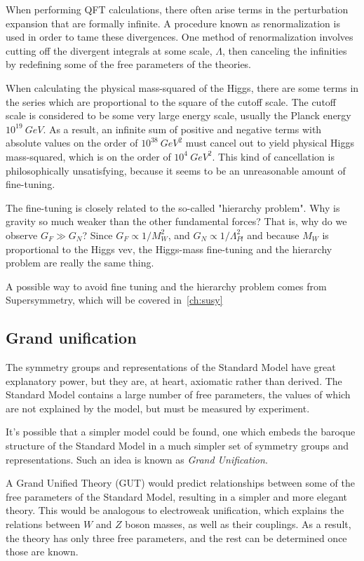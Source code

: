 When performing QFT calculations, there often arise terms in the perturbation expansion that are formally infinite.
A procedure known as renormalization is used in order to tame these divergences.
One method of renormalization involves cutting off the divergent integrals at some scale, $\Lambda$,
then canceling the infinities by redefining some of the free parameters of the theories.

When calculating the physical mass-squared of the Higgs, there are some terms in the series which are proportional to the square of the cutoff scale.
The cutoff scale is considered to be some very large energy scale, usually the Planck energy $10^{19}~GeV$.
As a result, an infinite sum of positive and negative terms with absolute values on the order of $10^{38}~GeV^2$ must cancel out
to yield physical Higgs mass-squared, which is on the order of $10^4~GeV^2$.
This kind of cancellation is philosophically unsatisfying, because it seems to be an unreasonable amount of fine-tuning.

The fine-tuning is closely related to the so-called "hierarchy problem".
Why is gravity so much weaker than the other fundamental forces?
That is, why do we observe $G_F \gg G_N$?
Since $G_F \propto 1/{M_W^2}$, and $G_N \propto 1/\Lambda_{Pl}^2$ and because $M_W$ is proportional to the Higgs vev,
the Higgs-mass fine-tuning and the hierarchy problem are really the same thing.

A possible way to avoid fine tuning and the hierarchy problem comes from Supersymmetry, which will be covered in~\ref{ch:susy}

\subsection{Grand unification}\label{subsec:sm_unification}

The symmetry groups and representations of the Standard Model have great explanatory power,
but they are, at heart, axiomatic rather than derived.
The Standard Model contains a large number of free parameters, the values of which are not explained by the model, but must be measured by experiment.

It's possible that a simpler model could be found, one which embeds the baroque structure of the Standard Model in a
much simpler set of symmetry groups and representations.
Such an idea is known as \textit{Grand Unification}.

A Grand Unified Theory (GUT) would predict relationships between some of the free parameters of the Standard Model,
resulting in a simpler and more elegant theory.
This would be analogous to electroweak unification, which explains the relations between $W$ and $Z$ boson masses,
as well as their couplings.
As a result, the theory has only three free parameters, and the rest can be determined once those are known.

